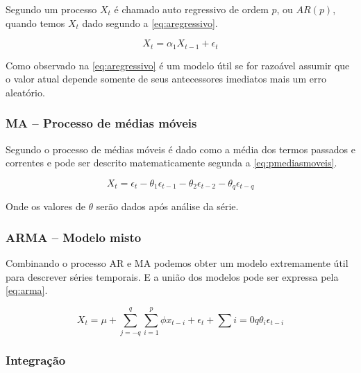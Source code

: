 \documentclass[
    12pt,
    oneside,
    a4paper,
    english,
    brazil
]{abntex2}
\begin{document}

Segundo  um processo $X_t$ é chamado auto regressivo de
ordem $p$, ou $AR(p)$, quando temos $X_t$ dado segundo a
\autoref{eq:aregressivo}.

\begin{equation}
    \label{eq:aregressivo}
    X_t = \alpha_1X_{t-1}+\epsilon_t
\end{equation}

Como observado na \autoref{eq:aregressivo} é um modelo útil se for razoável
assumir que o valor atual depende somente de seus antecessores imediatos mais
um erro aleatório.

\subsubsection{MA -- Processo de médias móveis}


Segundo  o processo de médias móveis é dado como
a média dos termos passados e correntes e pode ser descrito matematicamente
segunda a \autoref{eq:pmediasmoveis}.

\begin{equation}
    \label{eq:pmediasmoveis}
    X_t = \epsilon_t - \theta_1\epsilon_{t-1} - \theta_2\epsilon_{t-2} - \theta_{q}\epsilon_{t-q}
\end{equation}

Onde os valores de $\theta$ serão dados após análise da série.

\subsubsection{ARMA -- Modelo misto}

Combinando o processo AR e MA podemos obter um modelo extremamente útil para
descrever séries temporais. E a união dos modelos pode ser expressa pela
\autoref{eq:arma}.

\begin{equation}
    \label{eq:arma}
    X_t = \mu + \sum_{j=-q}^{q}\sum_{i = 1}^{p} \phi{}x_{t-i}+\epsilon_t+\sum{i = 0}{q}\theta_i\epsilon_{t-i}
\end{equation}

\subsubsection{Integração}
\end{document}
